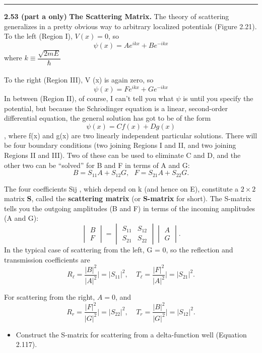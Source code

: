 \documentclass[fleqn]{article}
\begin{document}
\rule{15cm}{1pt}

\textbf{2.53 (part a only)}
\textbf{The Scattering Matrix.} The theory of scattering generalizes in a pretty obvious way to
arbitrary localized potentials (Figure 2.21). To the left (Region I), $V(x)=0$, so 
$$\psi(x)=A e^{ikx}+B e^{-ikx}$$
where $k\equiv \dfrac{\sqrt{2mE}}{\hbar}$
\\
\\
To the right (Region III), V (x) is again zero, so 
$$\psi(x)=F e^{ikx}+G e^{-ikx}$$ 
In between (Region II), of course, I can’t tell you what $\psi$ is until you specify the potential, but
because the Schr$\ddot{o}$dinger equation is a linear, second-order differential equation, the general
solution has got to be of the form 
$$\psi(x)=C f(x)+D g(x)$$,
where f(x) and g(x) are two linearly independent particular solutions. There will be four
boundary conditions (two joining Regions I and II, and two joining Regions II and III). Two of
these can be used to eliminate C and D, and the other two can be “solved” for B and F in terms
of A and G:
$$B=S_{11} A+S_{12} G, ~~~ F=S_{21}A +S_{22} G.$$

The four coefficients Sij , which depend on k (and hence on E), constitute a $2 \times 2$ matrix \textbf{S}, called
the \textbf{scattering matrix} (or \textbf{S-matrix} for short). The S-matrix tells you the outgoing
amplitudes (B and F) in terms of the incoming amplitudes (A and G):
$$\begin{vmatrix}
  B \\
  F
\end{vmatrix}=\begin{vmatrix}
  S_{11} & S_{12} \\
  S_{21} & S_{22}
\end{vmatrix} \begin{vmatrix}
  A \\
  G
\end{vmatrix}.$$
In the typical case of scattering from the left, G = 0, so the reflection and transmission
coefficients are 
$$R_{\ell}=\dfrac{|B|^2}{|A|^2}\Big|=|S_{11}|^2, ~~~~~ T_{\ell}=\dfrac{|F|^2}{|A|^2}\Big|=|S_{21}|^2.$$

For scattering from the right, $A=0$, and 
$$R_r=\dfrac{|F|^2}{|G|^2}\Big|=|S_{22}|^2, ~~~~~ T_r=\dfrac{|B|^2}{|G|^2}\Big|=|S_{12}|^2.$$

\begin{itemize}
  \item Construct the S-matrix for scattering from a delta-function well (Equation 2.117).

\end{itemize}
\end{document}
